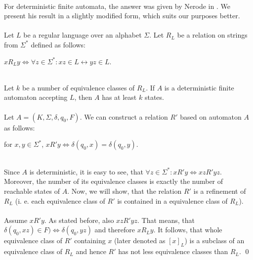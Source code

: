 \paragraph{}
For deterministic finite automata, the answer was given by Nerode in \cite{Nerode:LAT}. We present his result in a slightly modified form, which suits our purposes better.

\paragraph{}
\cveta Let $L$ be a regular language over an alphabet $\Sigma $. Let $R_{L}$ be a relation on strings from $\Sigma ^{*}$ defined as follows: \\
\centerline{$xR_{L}y \Leftrightarrow \forall z \in \Sigma ^{*}: xz \in L \leftrightarrow yz\in L$.}\\
Let $k$ be a number of equivalence classes of $R_{L}$. If $A$ is a deterministic finite automaton accepting $L$, then $A$ has at least $k$ states.

\paragraph{}
\dokaz Let $A = (K, \Sigma , \delta , q_{0}, F)$. We can construct a relation $R'$ based on automaton $A$ as follows: \\
\centerline{for $x, y \in \Sigma ^{*}$, $x R' y \Leftrightarrow \delta (q_{0}, x) = \delta (q_{0}, y)$.} \\
Since $A$ is deterministic, it is easy to see, that $\forall z \in \Sigma ^{*}: xR'y \Leftrightarrow xzR'yz$. Moreover, the number of its equivalence classes is exactly the number of reachable states of $A$. Now, we will show, that the relation $R'$ is a refinement of $R_{L}$ (i. e. each equivalence class of $R'$ is contained in a equivalence class of $R_{L}$).

\paragraph{}
Assume $xR'y$. As stated before, also $xzR'yz$. That means, that $\delta (q_{0}, xz) \in F) \Leftrightarrow \delta (q_{0}, yz)$ and therefore $xR_{L}y$. It follows, that whole equivalence class of $R'$ containing $x$ (later denoted as $[x]_{L}$) is a subclass of an equivalence class of $R_{L}$ and hence $R'$ has not less equivalence classes than $R_{L}$. \qed

